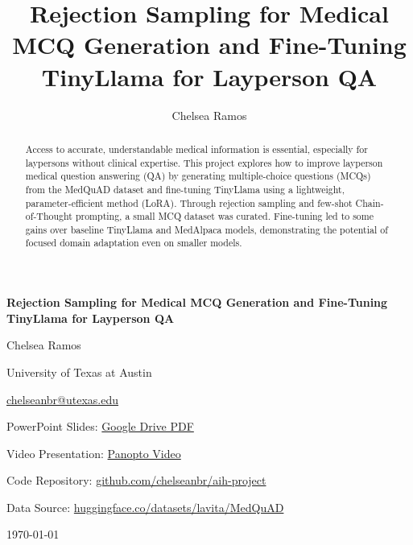 \documentclass[sigconf]{acmart}
\title{Rejection Sampling for Medical MCQ Generation and Fine-Tuning TinyLlama for Layperson QA}
\author{Chelsea Ramos}
\affiliation{
  \institution{University of Texas at Austin}
  \city{Austin}
  \state{Texas}
  \country{USA}
}
\begin{document}
\begin{titlepage}
    \centering
    \vspace*{2cm}
    {\Huge\bfseries Rejection Sampling for Medical MCQ Generation and Fine-Tuning TinyLlama for Layperson QA\par}
    \vspace{1cm}
    {\Large Chelsea Ramos \par}
    {\large University of Texas at Austin \par}
    {\large \href{mailto:chelseanbr@utexas.edu}{chelseanbr@utexas.edu} \par}
    
    \vspace{1.5cm}
    {\large PowerPoint Slides: \href{https://drive.google.com/file/d/1ghxoqiXGVCTL4_AEdxggXwwEkRFI7m9y/view?usp=sharing}{Google Drive PDF} \par}
    {\large Video Presentation: \href{https://utexas.hosted.panopto.com/Panopto/Pages/Viewer.aspx?id=8604cda6-79da-4452-ae0b-b2cd0004e74c&start=1}{Panopto Video} \par}
    {\large Code Repository: \href{https://github.com/chelseanbr/aih-project}{github.com/chelseanbr/aih-project} \par}
    {\large Data Source: \href{https://huggingface.co/datasets/lavita/MedQuAD}{huggingface.co/datasets/lavita/MedQuAD} \par}
    
    \vfill
    {\large \today \par}
\end{titlepage}

\begin{abstract}
Access to accurate, understandable medical information is essential, especially for laypersons without clinical expertise. This project explores how to improve layperson medical question answering (QA) by generating multiple-choice questions (MCQs) from the MedQuAD dataset and fine-tuning TinyLlama using a lightweight, parameter-efficient method (LoRA). Through rejection sampling and few-shot Chain-of-Thought prompting, a small MCQ dataset was curated. Fine-tuning led to some gains over baseline TinyLlama and MedAlpaca models, demonstrating the potential of focused domain adaptation even on smaller models.
\end{abstract}

\maketitle
\end{document}
